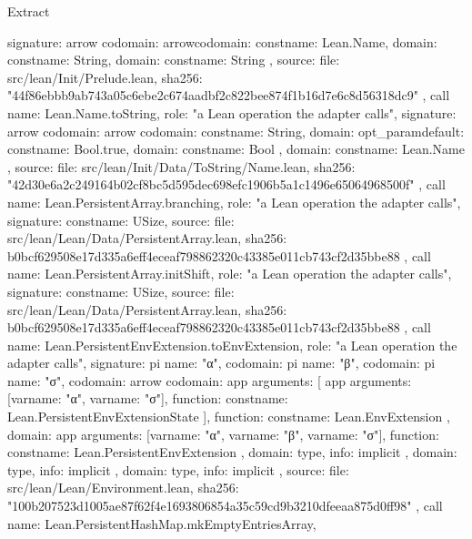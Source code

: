 \begin{lexlean}{Extract}
\begin{toolingmodule}
{{      signature: arrow{
        codomain: arrow{codomain: const{name: Lean.Name}, domain: const{name: String}},
        domain: const{name: String}
      },
      source: {
        file: src/lean/Init/Prelude.lean,
        sha256: "44f86ebbb9ab743a05c6ebe2c674aadbf2c822bee874f1b16d7e6c8d56318dc9"
      }
    },
    call{
      name: Lean.Name.toString,
      role: "a Lean operation the adapter calls",
      signature: arrow{
        codomain: arrow{
          codomain: const{name: String},
          domain: opt_param{default: const{name: Bool.true}, domain: const{name: Bool}}
        },
        domain: const{name: Lean.Name}
      },
      source: {
        file: src/lean/Init/Data/ToString/Name.lean,
        sha256: "42d30e6a2c249164b02cf8bc5d595dec698efc1906b5a1c1496e65064968500f"
      }
    },
    call{
      name: Lean.PersistentArray.branching,
      role: "a Lean operation the adapter calls",
      signature: const{name: USize},
      source: {
        file: src/lean/Lean/Data/PersistentArray.lean,
        sha256: b0bcf629508e17d335a6eff4eceaf798862320c43385e011cb743cf2d35bbe88
      }
    },
    call{
      name: Lean.PersistentArray.initShift,
      role: "a Lean operation the adapter calls",
      signature: const{name: USize},
      source: {
        file: src/lean/Lean/Data/PersistentArray.lean,
        sha256: b0bcf629508e17d335a6eff4eceaf798862320c43385e011cb743cf2d35bbe88
      }
    },
    call{
      name: Lean.PersistentEnvExtension.toEnvExtension,
      role: "a Lean operation the adapter calls",
      signature: pi{
        name: "α",
        codomain: pi{
          name: "β",
          codomain: pi{
            name: "σ",
            codomain: arrow{
              codomain: app{
                arguments: [
                  app{
                    arguments: [var{name: "α"}, var{name: "σ"}],
                    function: const{name: Lean.PersistentEnvExtensionState}
                  }
                ],
                function: const{name: Lean.EnvExtension}
              },
              domain: app{
                arguments: [var{name: "α"}, var{name: "β"}, var{name: "σ"}],
                function: const{name: Lean.PersistentEnvExtension}
              }
            },
            domain: type{},
            info: implicit
          },
          domain: type{},
          info: implicit
        },
        domain: type{},
        info: implicit
      },
      source: {
        file: src/lean/Lean/Environment.lean,
        sha256: "100b207523d1005ae87f62f4e1693806854a35c59cd9b3210dfeeaa875d0ff98"
      }
    },
    call{
      name: Lean.PersistentHashMap.mkEmptyEntriesArray,
}}
\end{toolingmodule}
\end{lexlean}
